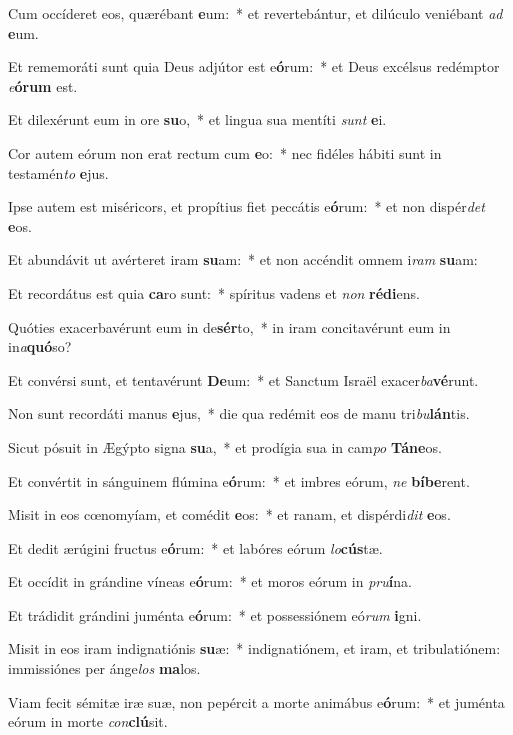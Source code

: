 \item Cum occíderet eos, quærébant \textbf{e}um:~* et revertebántur, et dilúculo veniébant \textit{ad} \textbf{e}um.
\item Et rememoráti sunt quia Deus adjútor est e\textbf{ó}rum:~* et Deus excélsus redémptor \textit{e}\textbf{ó}\textbf{rum} est.
\item Et dilexérunt eum in ore \textbf{su}o,~* et lingua sua mentíti \textit{sunt} \textbf{e}i.
\item Cor autem eórum non erat rectum cum \textbf{e}o:~* nec fidéles hábiti sunt in testamén\textit{to} \textbf{e}jus.
\item Ipse autem est miséricors, et propítius fiet peccátis e\textbf{ó}rum:~* et non dispér\textit{det} \textbf{e}os.
\item Et abundávit ut avérteret iram \textbf{su}am:~* et non accéndit omnem i\textit{ram} \textbf{su}am:
\item Et recordátus est quia \textbf{ca}ro sunt:~* spíritus vadens et \textit{non} \textbf{réd}\textbf{i}ens.
\item Quóties exacerbavérunt eum in de\textbf{sér}to,~* in iram concitavérunt eum in in\textit{a}\textbf{quó}so?
\item Et convérsi sunt, et tentavérunt \textbf{De}um:~* et Sanctum Israël exacer\textit{ba}\textbf{vé}runt.
\item Non sunt recordáti manus \textbf{e}jus,~* die qua redémit eos de manu tri\textit{bu}\textbf{lán}tis.
\item Sicut pósuit in Ægýpto signa \textbf{su}a,~* et prodígia sua in cam\textit{po} \textbf{Tá}\textbf{ne}os.
\item Et convértit in sánguinem flúmina e\textbf{ó}rum:~* et imbres eórum, \textit{ne} \textbf{bí}\textbf{be}rent.
\item Misit in eos cœnomyíam, et comédit \textbf{e}os:~* et ranam, et dispérdi\textit{dit} \textbf{e}os.
\item Et dedit ærúgini fructus e\textbf{ó}rum:~* et labóres eórum \textit{lo}\textbf{cús}tæ.
\item Et occídit in grándine víneas e\textbf{ó}rum:~* et moros eórum in \textit{pru}\textbf{í}na.
\item Et trádidit grándini juménta e\textbf{ó}rum:~* et possessiónem eó\textit{rum} \textbf{i}gni.
\item Misit in eos iram indignatiónis \textbf{su}æ:~* indignatiónem, et iram, et tribulatiónem: immissiónes per ánge\textit{los} \textbf{ma}los.
\item Viam fecit sémitæ iræ suæ, non pepércit a morte animábus e\textbf{ó}rum:~* et juménta eórum in morte \textit{con}\textbf{clú}sit.
